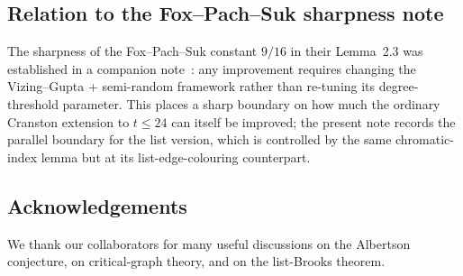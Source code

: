 \documentclass[11pt,a4paper]{article}
\theoremstyle{definition}
\begin{document}
\subsection{Relation to the Fox--Pach--Suk sharpness note}

The sharpness of the Fox--Pach--Suk constant $9/16$ in their
Lemma~2.3 was established in a companion note~\cite{D8}: any
improvement requires changing the Vizing--Gupta + semi-random
framework rather than re-tuning its degree-threshold parameter.
This places a sharp boundary on how much the ordinary Cranston
extension to $t \le 24$ can itself be improved; the present note
records the parallel boundary for the list version, which is
controlled by the same chromatic-index lemma but at its
list-edge-colouring counterpart.

\subsection*{Acknowledgements}

We thank our collaborators for many useful discussions on the
Albertson conjecture, on critical-graph theory, and on the
list-Brooks theorem.
\end{document}
